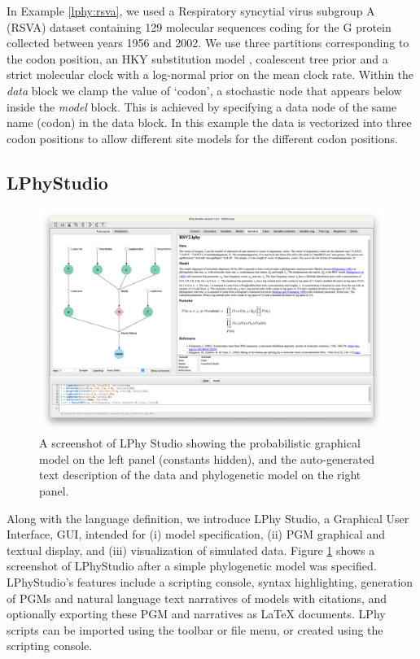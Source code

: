 \documentclass[10pt,letterpaper,table]{article}
\theoremstyle{definition}
\begin{document}
In Example \ref{lphy:rsva}, we used a Respiratory syncytial virus subgroup A (RSVA) dataset \cite{zlateva2004molecular, zlateva2005genetic} containing 129 molecular sequences coding for the G protein collected between years 1956 and 2002. 
We use three partitions corresponding to the codon position, an HKY substitution model \cite{hasegawa1985dating}, coalescent tree prior \cite{kingman82} and a strict molecular clock with a log-normal prior on the mean clock rate. 
Within the \textit{data} block we clamp the value of `codon', a stochastic node that appears below inside the \textit{model} block. 
This is achieved by specifying a data node of the same name (codon) in the data block. 
In this example the data is vectorized into three codon positions to allow different site models for the different codon positions.

\subsection{LPhyStudio} 
\begin{figure}[!h]
  \includegraphics[width=\textwidth]{figs_plos/Fig2.png}
  \caption{A screenshot of LPhy Studio showing the probabilistic graphical model 
  on the left panel (constants hidden), and the auto-generated text description of the data and phylogenetic model on the right panel.} 
  \label{fig:lphystudio}
\end{figure}
Along with the language definition, we introduce LPhy Studio, a Graphical User Interface, GUI, intended for (i) model specification, (ii) PGM graphical and textual display, and (iii) visualization of simulated data.
Figure \ref{fig:lphystudio} shows a screenshot of LPhyStudio after a simple phylogenetic model was specified. 
LPhyStudio's features include a scripting console, syntax highlighting, generation of PGMs and natural language text narratives of models with citations, and optionally exporting these PGM and narratives as LaTeX documents. 
LPhy scripts can be imported using the toolbar or file menu, or created using the scripting console. 
\end{document}
